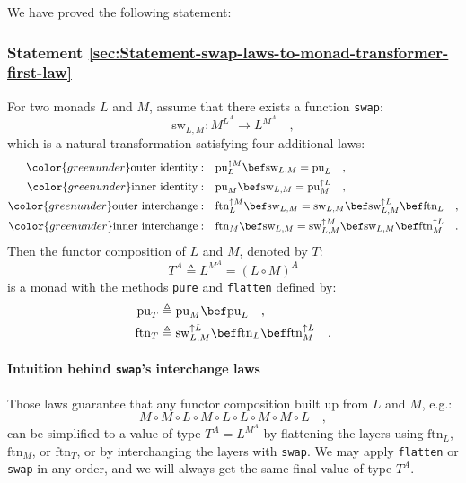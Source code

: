 We have proved the following statement:

\subsubsection{Statement \label{sec:Statement-swap-laws-to-monad-transformer-first-law}\ref{sec:Statement-swap-laws-to-monad-transformer-first-law}}

For two monads $L$ and $M$, assume that there exists a function
\lstinline!swap!:
\[
\text{sw}_{L,M}:M^{L^{A}}\rightarrow L^{M^{A}}\quad,
\]
which is a natural transformation satisfying four additional laws:
\begin{align*}
{\color{greenunder}\text{outer identity}:}\quad & \text{pu}_{L}^{\uparrow M}\bef\text{sw}_{L,M}=\text{pu}_{L}\quad,\\
{\color{greenunder}\text{inner identity}:}\quad & \text{pu}_{M}\bef\text{sw}_{L,M}=\text{pu}_{M}^{\uparrow L}\quad,\\
{\color{greenunder}\text{outer interchange}:}\quad & \text{ftn}_{L}^{\uparrow M}\bef\text{sw}_{L,M}=\text{sw}_{L,M}\bef\text{sw}_{L,M}^{\uparrow L}\bef\text{ftn}_{L}\quad,\\
{\color{greenunder}\text{inner interchange}:}\quad & \text{ftn}_{M}\bef\text{sw}_{L,M}=\text{sw}_{L,M}^{\uparrow M}\bef\text{sw}_{L,M}\bef\text{ftn}_{M}^{\uparrow L}\quad.
\end{align*}
Then the functor composition of $L$ and $M$, denoted by $T$:
\[
T^{A}\triangleq L^{M^{A}}=\left(L\circ M\right)^{A}
\]
is a monad with the methods \lstinline!pure! and \lstinline!flatten!
defined by:
\begin{align}
\text{pu}_{T} & \triangleq\text{pu}_{M}\bef\text{pu}_{L}\quad,\label{eq:def-pure-T-via-pure-L-and-pure-M}\\
\text{ftn}_{T} & \triangleq\text{sw}_{L,M}^{\uparrow L}\bef\text{ftn}_{L}\bef\text{ftn}_{M}^{\uparrow L}\quad.\label{eq:def-flatten-T-via-sw-and-flatten-L-M}
\end{align}


\paragraph{Intuition behind \texttt{swap}\textsf{'}s interchange laws}

Those laws guarantee that any functor composition built up from $L$
and $M$, e.g.:
\[
M\circ M\circ L\circ M\circ L\circ L\circ M\circ M\circ L\quad,
\]
can be simplified to a value of type $T^{A}=L^{M^{A}}$ by flattening
the layers using $\text{ftn}_{L}$, $\text{ftn}_{M}$, or $\text{ftn}_{T}$,
or by interchanging the layers with \lstinline!swap!. We may apply
\lstinline!flatten! or \lstinline!swap! in any order, and we will
always get the same final value of type $T^{A}$.

